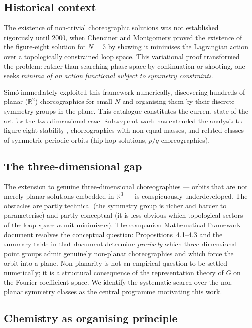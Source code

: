 \documentclass[12pt, a4paper]{article}
\theoremstyle{definition}
\newcommand{\R}{\mathbb{R}}
\begin{document}
\subsection{Historical context}

The existence of non-trivial choreographic solutions was not established
rigorously until 2000, when Chenciner and Montgomery \cite{CM2000} proved
the existence of the figure-eight solution for $N = 3$ by showing it
minimises the Lagrangian action over a topologically constrained loop space.
This variational proof transformed the problem: rather than searching phase
space by continuation or shooting, one seeks \emph{minima of an action
functional subject to symmetry constraints}.

Sim\'o \cite{Simo2002} immediately exploited this framework numerically,
discovering hundreds of planar ($\R^2$) choreographies for small $N$ and
organising them by their discrete symmetry groups in the plane. This
catalogue constitutes the current state of the art for the two-dimensional
case. Subsequent work has extended the analysis to figure-eight stability
\cite{Chenciner2005}, choreographies with non-equal masses, and related
classes of symmetric periodic orbits (hip-hop solutions, $p/q$-choreographies).

\subsection{The three-dimensional gap}

The extension to genuine three-dimensional choreographies — orbits that
are not merely planar solutions embedded in $\R^3$ — is conspicuously
underdeveloped. The obstacles are partly technical (the symmetry group is
richer and harder to parameterise) and partly conceptual (it is less
obvious which topological sectors of the loop space admit minimisers).
The companion Mathematical Framework document \cite{MathFrame2026}
resolves the conceptual question: Propositions~4.1--4.3 and the summary
table in that document determine \emph{precisely} which three-dimensional
point groups admit genuinely non-planar choreographies and which force
the orbit into a plane. Non-planarity is not an empirical question to
be settled numerically; it is a structural consequence of the
representation theory of $G$ on the Fourier coefficient space.
We identify the systematic search over the non-planar symmetry classes
as the central programme motivating this work.

\subsection{Chemistry as organising principle}
\end{document}

